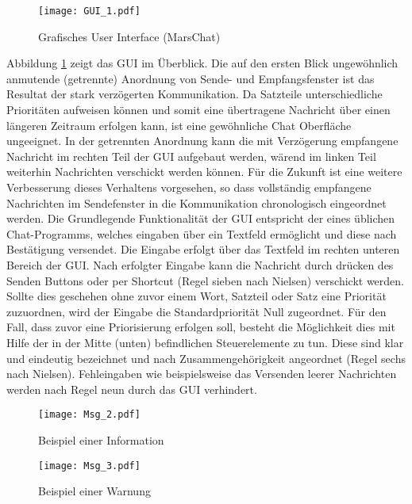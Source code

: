 \begin{figure}[H]
\centering
\texttt{[image: GUI\_1.pdf]}
\caption{Grafisches User Interface (MarsChat)}
\label{fig:GUI}
\end{figure}

Abbildung \ref{fig:GUI} zeigt das \gls{GUI} im {\"U}berblick. Die auf den
ersten Blick ungew{\"o}hnlich anmutende (getrennte) Anordnung von Sende- und
Empfangsfenster ist das Resultat der stark verz{\"o}gerten Kommunikation. Da
Satzteile unterschiedliche Priorit{\"a}ten aufweisen k{\"o}nnen und somit eine
{\"u}bertragene Nachricht {\"u}ber einen l{\"a}ngeren Zeitraum erfolgen kann,
ist eine gew{\"o}hnliche Chat Oberfl{\"a}che ungeeignet. In der getrennten
Anordnung kann die mit Verz{\"o}gerung empfangene Nachricht im rechten Teil der
\gls{GUI} aufgebaut werden, w{\"a}rend im linken Teil weiterhin Nachrichten verschickt
werden k{\"o}nnen. F{\"u}r die Zukunft ist eine weitere Verbesserung dieses
Verhaltens vorgesehen, so dass vollst{\"a}ndig empfangene Nachrichten im
Sendefenster in die Kommunikation chronologisch eingeordnet werden. Die
Grundlegende Funktionalit{\"a}t der \gls{GUI} entspricht der eines {\"u}blichen
Chat-Programms, welches eingaben {\"u}ber ein Textfeld erm{\"o}glicht und diese
nach Best{\"a}tigung versendet. Die Eingabe erfolgt {\"u}ber das Textfeld im
rechten unteren Bereich der \gls{GUI}. Nach erfolgter Eingabe kann die Nachricht
durch dr{\"u}cken des Senden Buttons oder per Shortcut (Regel sieben nach
Nielsen) verschickt werden.
Sollte dies geschehen ohne zuvor einem Wort, Satzteil oder Satz eine
Priorit{\"a}t zuzuordnen, wird der Eingabe die Standardpriorit{\"a}t Null
zugeordnet. F{\"u}r den Fall, dass zuvor eine Priorisierung erfolgen soll,
besteht die M{\"o}glichkeit dies mit Hilfe der in der Mitte (unten) befindlichen
Steuerelemente zu tun. Diese sind klar und eindeutig bezeichnet und nach
Zusammengeh{\"o}rigkeit angeordnet (Regel sechs nach Nielsen). Fehleingaben wie
beispielsweise das Versenden leerer Nachrichten werden nach Regel neun durch das
\gls{GUI} verhindert.

\begin{figure}[H]
\centering
\texttt{[image: Msg\_2.pdf]}
\caption{Beispiel einer Information}
\label{fig:Msg2}
\end{figure}

\begin{figure}[H]
\centering
\texttt{[image: Msg\_3.pdf]}
\caption{Beispiel einer Warnung}
\label{fig:Msg3}
\end{figure}

